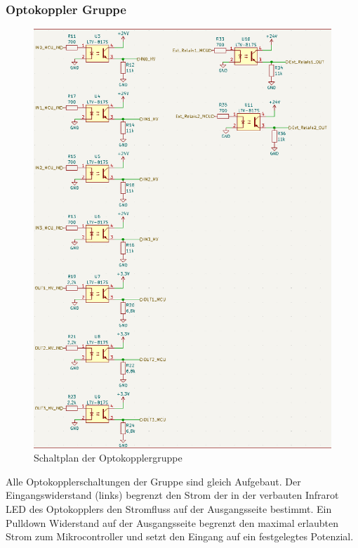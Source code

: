 \subsubsection{Optokoppler Gruppe}
\begin{figure}[H]
	\centering
	\includegraphics[width=1.0\textwidth]{images/Hardware/Optokoppler_Schaltplan.PNG}
	\caption{Schaltplan der Optokopplergruppe}
	\label{fig:Optokoppler_gruppe}
\end{figure}
Alle Optokopplerschaltungen der Gruppe sind gleich Aufgebaut. Der Eingangswiderstand (links) begrenzt den Strom der in der verbauten Infrarot LED des Optokopplers den Stromfluss auf der Ausgangsseite bestimmt. Ein Pulldown Widerstand auf der Ausgangsseite begrenzt den maximal erlaubten Strom zum Mikrocontroller und setzt den Eingang auf ein festgelegtes Potenzial.
